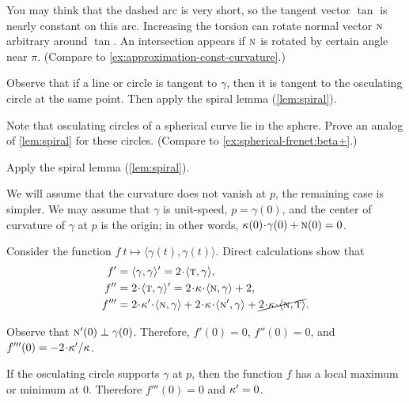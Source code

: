 \begin{multicols}{2}
You may think that the dashed arc is very short, so the tangent vector $\tan$ is nearly constant on this arc. 
Increasing the torsion can rotate normal vector $\text{\sc{n}}$ arbitrary around $\tan$.
An intersection appears if $\text{\sc{n}}$ is rotated by certain angle near $\pi$.
(Compare to \ref{ex:approximation-const-curvature}.)

Observe that if a line or circle is tangent to $\gamma$,
then it is tangent to the osculating circle at the same point.
Then apply the spiral lemma (\ref{lem:spiral}).

Note that osculating circles of a spherical curve lie in the sphere.
Prove an analog of \ref{lem:spiral} for these circles.
(Compare to \ref{ex:spherical-frenet:beta+}.)



\setcounter{eqtn}{0}

Apply the spiral lemma (\ref{lem:spiral}).

We will assume that the curvature does not vanish at $p$, the remaining case is simpler.
We may assume that $\gamma$ is unit-speed, $p=\gamma(0)$,
and the center of curvature of $\gamma$ at $p$ is the origin;
in other words, $\kur(0)\cdot\gamma(0)+ \norm(0)=0$.

Consider the function $f\:t\mapsto \langle\gamma(t),\gamma(t)\rangle$.
Direct calculations show that 
\begin{align*}
f'
&=\langle\gamma,\gamma\rangle'
=2\cdot\langle\tan,\gamma\rangle,
\\
f''
&=2\cdot\langle\tan,\gamma\rangle'
=2\cdot\kur\cdot\langle\norm,\gamma\rangle+2,
\\
f'''
&=2\cdot\kur'\cdot\langle\norm,\gamma\rangle
+2\cdot\kur\cdot\langle\norm',\gamma\rangle+\cancel{2\cdot\kur\cdot\langle\norm,\tan\rangle}.
\end{align*}

Observe that $\text{\sc{n}}'(0)\perp\gamma(0)$.
Therefore, $f'(0)=0$, $f''(0)=0$, and $f'''(0)\z=-2\cdot\kur'/\kur$.

If the osculating circle supports $\gamma$ at $p$,
then the function $f$ has a local maximum or minimum at $0$.
Therefore $f'''(0)=0$ and $\kappa'=0$.


\end{multicols}
